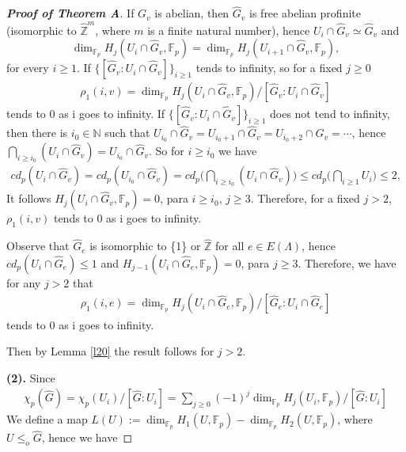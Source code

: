 \documentclass[10pt]{amsart}
\theoremstyle{plain}
\theoremstyle{definition}
\theoremstyle{remark}
\numberwithin{prop}{section}
\numberwithin{example}{section}
\numberwithin{equation}{section}
\newcommand{\Z}{\mathbb{Z}}
\newcommand{\N}{\mathbb{N}}
\newcommand{\F}{\mathbb{F}}
\begin{document}
\begin{proof}[\textbf{Proof of Theorem A}]
		
		If $G_v$  is abelian, then $\widehat{G}_v$ is free abelian profinite (isomorphic to $\widehat{\Z}^m$, where  $m$  is a finite natural number), hence $U_i\cap \widehat{G}_v\simeq \widehat{G}_v$  and  $$\dim_{\F_p}{H_j(U_i\cap \widehat{G}_v,\F_p)}= \dim_{\F_p}{H_j(U_{i+1}\cap\widehat{G}_v,\F_p)},$$ for every  $i\geq 1$. If  $\{[\widehat{G}_v:U_i\cap \widehat{G}_v]\}_{i\geq 1}$ tends to infinity, so for a fixed   $j\geq 0$ 
		\begin{align*}
			\rho_1(i,v)=\dim_{\F_p}{H_j(U_i\cap \widehat{G}_v,\F_p)}/[\widehat{G}_v:U_i\cap \widehat{G}_v]
		\end{align*}
		tends to 0 as i goes to infinity.  	If  $\{[\widehat{G}_v:U_i\cap \widehat{G}_v]\}_{i\geq 1}$ does not tend to
		infinity, then there is $i_0\in \N$ such that  $U_{i_0}\cap \widehat{G}_v=U_{i_0+1}\cap \widehat{G}_v=U_{i_0+2}\cap \widehat{G}_v=\cdots$, hence   $\displaystyle\bigcap_{i\geq i_0}{(U_i\cap \widehat{G}_v)}=U_{i_0}\cap \widehat{G}_v$.  So for $i\geq i_0$ we have 
		\begin{align}
			cd_p(U_{i}\cap \widehat{G}_v)= cd_p(U_{i_0}\cap \widehat{G}_v)=cd_p\big(\displaystyle\bigcap_{i\geq i_0}{(U_i\cap \widehat{G}_v)}\big)\leq cd_p\big(\displaystyle\bigcap_{i\geq 1}{U_i}\big)\leq 2, 
		\end{align}
		It follows  	$H_j(U_i\cap \widehat{G}_v,\F_p)=0$, para $i\geq i_0$,  $j\geq 3$. Therefore, for a fixed $j>2$,  	
		$\rho_1(i,v)$
		tends to 0 as i goes to infinity.
		
		Observe that $\widehat{G}_e$ is isomorphic to \{1\} or     $\widehat{\Z}$   for all $ e\in E(\Lambda)$, hence $cd_p(U_i\cap \widehat{G}_e)\leq 1$ and $H_{j-1}(U_i\cap \widehat{G}_e,\F_p)=0$, para $j\geq 3$.   Therefore,  we
		have for any $j>2$ that  
		\begin{align}
			\rho_1(i,e)=\dim_{\F_p}{H_j(U_i\cap \widehat{G}_e,\F_p)}/[\widehat{G}_e:U_i\cap \widehat{G}_e]
		\end{align}
		tends to 0 as i goes to infinity.
		
		
		Then by Lemma \ref{l20} the result follows for $j>2$.
		
		
		\item[\textbf{(2).}]  
		Since
		\begin{align}
			\chi_p(\widehat{G})=\chi_p(U_i)/[\widehat{G}:U_i]=\sum_{j\geq 0}{(-1)^j \dim_{\F_p}{H_j(U_i,\F_p)}/[\widehat{G}:U_i]}
		\end{align}
		We define  a map   $L(U):=\dim_{\F_p}H_1(U,\F_p)-\dim_{\F_p}H_2(U,\F_p)$, where $U\leq_o\widehat{G}$, hence we have    
		

\end{proof}
\end{document}
